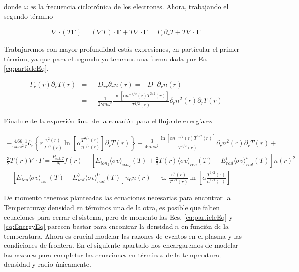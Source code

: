 donde $\omega$ es la frecuencia ciclotr\'onica de los electrones. Ahora, trabajando el segundo t\'ermino

\begin{eqnarray}
  \nabla\cdot(T\pmb{\Gamma}) = (\nabla T) \cdot \pmb{\Gamma} + T\nabla\cdot\pmb{\Gamma} = \Gamma_r\partial_r T + T\nabla\cdot{\pmb{\Gamma}}
\end{eqnarray}

Trabajaremos con mayor profundidad est\'as expresiones, en part\'icular el primer t\'ermino, ya que para el segundo ya tenemos una forma dada por Ec. \eqref{eq:particleEq}. 

\begin{eqnarray}
  \Gamma_r(r)\partial_rT(r) &=& -D_{rr}\partial_r n(r) = -D_\perp\partial_r n(r) \nonumber\\
                            &=& -\frac{1}{2\gamma m\omega^2}\frac{\ln\left[\alpha n^{-1/2}(r)T^{3/2}(r)\right]}{T^{1/2}(r)}\partial_r n^2(r)\partial_r T(r)
\end{eqnarray}

Finalmente la expresi\'on final de la ecuaci\'on para el flujo de energ\'ia es

\begin{eqnarray}\label{eq:ODE2}
 -\frac{4.66}{\gamma m\omega^2}\frac{1}{r}\partial_r\left\{r \frac{n^2(r)}{T^{1/2}(r)}\ln\left[\alpha \frac{T^{3/2}(r)}{n^{1/2}(r)}\right] \partial_r T(r)\right\} - \frac{3}{4\gamma m\omega^2}\frac{\ln\left[\alpha n^{-1/2}(r)T^{3/2}(r)\right]}{T^{1/2}(r)}\partial_r n^2(r)\partial_r T(r) \nonumber + \nonumber\\
 \frac{3}{2}T(r)\nabla\cdot\Gamma =  \frac{P_{ext,T}}{N}f(r) -  [E_{ion_2}\langle\sigma v\rangle_{ion_2}(T) + \frac{3}{2}T(r)\langle\sigma v\rangle_{rec}(T) + E_{rad}^i\langle\sigma v\rangle_{rad}^i(T)]n(r)^2 \nonumber \\ - [E_{ion}\langle\sigma v\rangle_{ion}(T)+ E_{rad}^0\langle\sigma v\rangle_{rad}^0(T)]n_0n(r) - \varpi\frac{n^2(r)}{T^{1/2}(r)}\ln\left[\alpha \frac{T^{3/2}(r)}{n^{1/2}(r)}\right]\label{eq:EnergyEq}
\end{eqnarray}

De momento tenemos planteadas las ecuaciones necesarias para encontrar la Temperaturay densidad en t\'erminos una de la otra, es posible que falten ecuaciones para cerrar el sistema, pero de momento las Ecs. \eqref{eq:particleEq} y \eqref{eq:EnergyEq} parecen bastar para encontrar la densidad $n$ en funci\'on de la temperatura. Ahora es crucial modelar las razones de eventos en el plasma y las condiciones de frontera. En el siguiente apartado nos encargaremos de modelar las razones para completar las ecuaciones en t\'erminos de la temperatura, densidad y radio \'unicamente.
